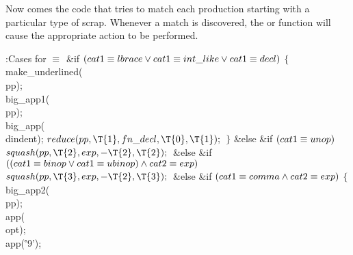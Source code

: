 Now comes the code that tries to match each production starting
with a particular type of scrap. Whenever a match is discovered,
the  or  function will cause the appropriate
action
to be performed.

\Y\B\4:Cases for \X${}\equiv{}$\6
\&{if} ${}(\\{cat1}\E\\{lbrace}\V\\{cat1}\E\\{int\_like}\V\\{cat1}\E%
\\{decl}){}$\5
${}\{{}$\1\6
\\{make\_underlined}(\\{pp});\6
\\{big\_app1}(\\{pp});\6
\\{big\_app}(\\{dindent});\6
${}\\{reduce}(\\{pp},\39\T{1},\39\\{fn\_decl},\39\T{0},\39\T{1});{}$\6
\4${}\}{}$\2\6
\&{else} \&{if} ${}(\\{cat1}\equiv\\{unop}){}$\1\5
${}\\{squash}(\\{pp},\39\T{2},\39\\{exp},\39{-}\T{2},\39\T{2});{}$\2\6
\&{else} \&{if} ${}((\\{cat1}\E\\{binop}\V\\{cat1}\E\\{ubinop})\W\\{cat2}\E%
\\{exp}){}$\1\5
${}\\{squash}(\\{pp},\39\T{3},\39\\{exp},\39{-}\T{2},\39\T{3});{}$\2\6
\&{else} \&{if} ${}(\\{cat1}\equiv\\{comma}\land\\{cat2}\equiv\\{exp}){}$\5
${}\{{}$\1\6
\\{big\_app2}(\\{pp});\6
\\{app}(\\{opt});\6
\\{app}(\.{'9'});\6
